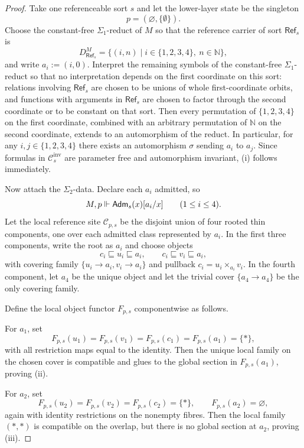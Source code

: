 \begin{proof}
Take one referenceable sort $s$ and let the lower-layer state be the singleton
\[
p=(\varnothing,\{\emptyset\}).
\]
Choose the constant-free $\Sigma_1$-reduct of $M$ so that the reference carrier of sort $\mathsf{Ref}_s$ is
\[
D_{\mathsf{Ref}_s}^M=\{(i,n)\mid i\in\{1,2,3,4\},\ n\in\mathbb N\},
\]
and write $a_i:=(i,0)$. Interpret the remaining symbols of the constant-free $\Sigma_1$-reduct so that no interpretation depends on the first coordinate on this sort: relations involving $\mathsf{Ref}_s$ are chosen to be unions of whole first-coordinate orbits, and functions with arguments in $\mathsf{Ref}_s$ are chosen to factor through the second coordinate or to be constant on that sort. Then every permutation of $\{1,2,3,4\}$ on the first coordinate, combined with an arbitrary permutation of $\mathbb N$ on the second coordinate, extends to an automorphism of the reduct. In particular, for any $i,j\in\{1,2,3,4\}$ there exists an automorphism $\sigma$ sending $a_i$ to $a_j$. Since formulas in $\mathcal{C}_{s}^{\mathrm{inv}}$ are parameter free and automorphism invariant, \textup{(i)} follows immediately.

Now attach the $\Sigma_2$-data. Declare each $a_i$ admitted, so
\[
M,p\Vdash \mathsf{Adm}_s(x)[a_i/x]
\qquad
(1\le i\le 4).
\]
Let the local reference site $\mathcal C_{p,s}$ be the disjoint union of four rooted thin components, one over each admitted class represented by $a_i$. In the first three components, write the root as $a_i$ and choose objects
\[
c_i\sqsubseteq u_i\sqsubseteq a_i,
\qquad
c_i\sqsubseteq v_i\sqsubseteq a_i,
\]
with covering family $\{u_i\to a_i,v_i\to a_i\}$ and pullback $c_i=u_i\times_{a_i}v_i$. In the fourth component, let $a_4$ be the unique object and let the trivial cover $\{a_4\to a_4\}$ be the only covering family.

Define the local object functor $F_{p,s}$ componentwise as follows.

For $a_1$, set
\[
F_{p,s}(u_1)=F_{p,s}(v_1)=F_{p,s}(c_1)=F_{p,s}(a_1)=\{*\},
\]
with all restriction maps equal to the identity. Then the unique local family on the chosen cover is compatible and glues to the global section in $F_{p,s}(a_1)$, proving \textup{(ii)}.

For $a_2$, set
\[
F_{p,s}(u_2)=F_{p,s}(v_2)=F_{p,s}(c_2)=\{*\},
\qquad
F_{p,s}(a_2)=\varnothing,
\]
again with identity restrictions on the nonempty fibres. Then the local family $(*,*)$ is compatible on the overlap, but there is no global section at $a_2$, proving \textup{(iii)}.


\end{proof}
